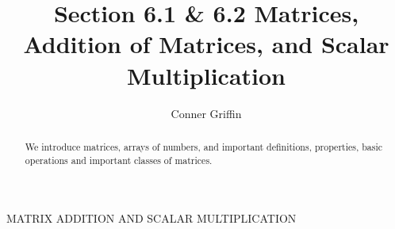 \documentclass{ximera}
\title{Section 6.1 \& 6.2 Matrices, Addition of Matrices, and Scalar Multiplication}
\author{Conner Griffin}
\begin{document}
\begin{abstract}
    We introduce matrices, arrays of numbers, and important definitions, properties, basic operations and important classes of matrices.
\end{abstract}
\maketitle







MATRIX ADDITION AND SCALAR MULTIPLICATION



\end{document}
